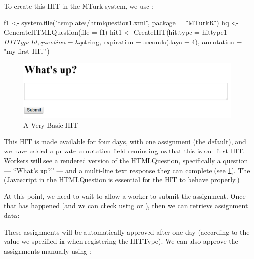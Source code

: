 \noindent To create this HIT in the MTurk system, we use :

\begin{example}
f1 <- system.file("templates/htmlquestion1.xml", package = "MTurkR")
hq <- GenerateHTMLQuestion(file = f1)
hit1 <- CreateHIT(hit.type = hittype1$HITTypeId, 
                  question = hq$string,
                  expiration = seconds(days = 4),
                  annotation = "my first HIT")
\end{example}

\begin{figure}
\begin{center}
\includegraphics[width=\textwidth]{hit1}
\end{center}
\caption{A Very Basic HIT}\label{fig:hit1}
\end{figure}

\noindent This HIT is made available for four days, with one assignment (the default), and we have added a private annotation field reminding us that this is our first HIT. Workers will see a rendered version of the HTMLQuestion, specifically a question --- ``What's up?'' --- and a multi-line text response they can complete (see \ref{fig:hit1}). The (Javascript in the HTMLQuestion is essential for the HIT to behave properly.)

At this point, we need to wait to allow a worker to submit the assignment. Once that has happened (and we can check using  or ), then we can retrieve assignment data:


These assignments will be automatically approved after one day (according to the value we specified in  when registering the HITType). We can also approve the assignments manually using :

